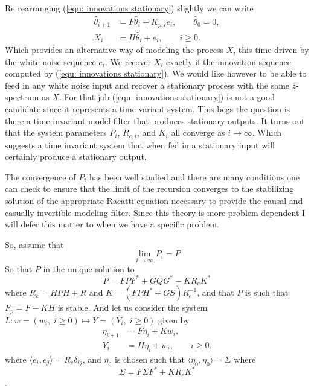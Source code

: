 \documentclass[12pt]{amsart}
\begin{document}
Re rearranging (\ref{equ: innovations stationary}) slightly we can write
\begin{subequations}
	\label{equ: model}
	\begin{align}
	\hat{\theta}_{i+1} &= F\hat{\theta}_{i} + K_{p,i}e_i,\qquad \hat{\theta}_0 = 0,\\
	X_i &= H\hat{\theta}_i + e_i, \qquad i \ge 0.
	\end{align}
\end{subequations}
Which provides an alternative way of modeling the process $X$, this time driven by the white noise sequence $e_i$. We recover $X_i$ exactly if the innovation sequence computed by (\ref{equ: innovations stationary}). We would like however to be able to feed in any white noise input and recover a stationary process with the same $z$-spectrum as $X$. For that job (\ref{equ: innovations stationary}) is not a good candidate since it represents a time-variant system. This begs the question is there a time invariant model filter that produces stationary outputs. It turns out that the system parameters $P_i$, $R_{e,i}$, and $K_i$ all converge as $i\rightarrow \infty$. Which suggests a time invariant system that when fed in a stationary input will certainly produce a stationary output. 

The convergence of $P_i$ has been well studied \cite[sec.~14.5]{kailath2000} and there are many conditions one can check to ensure that the limit of the recursion converges to the stabilizing solution of the appropriate Racatti equation necessary to provide the causal and casually invertible modeling filter. Since this theory is more problem dependent I will defer this matter to when we have a specific problem. 

So, assume that
$$\lim_{i\rightarrow \infty} P_i = P$$
So that $P$ in the unique solution to 
$$P = FPF^* + GQG^* - KR_eK^*$$
where $R_e = HPH+R$ and $K = (FPH^* + GS)R^{-1}_e$, and that $P$ is such that $F_p = F - KH$ is stable. And let us consider the system $L: w = (w_i,\; i\ge 0) \mapsto Y = (Y_i,\; i\ge 0)$ given by 
\begin{subequations}
	\label{equ: whitening}
	\begin{align}
	\eta_{i+1} &= F\eta_{i} + Kw_i,\\
	Y_i &= H\eta_i+ w_i, \qquad i \ge 0.	
	\end{align}
\end{subequations}
where $ \langle e_i,e_j \rangle = R_e\delta_{ij}$, and $\eta_0$ is chosen such that $\langle \eta_0, \eta_0 \rangle = \Sigma$ where $$\Sigma =F\Sigma F^* +KR_eK^*$$.
\end{document}
